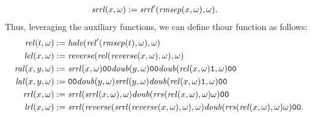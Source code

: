\begin{defn}
\begin{align*}
      \mathit{srrl}(x, \omega) &:= \mathit{srrl}'(\mathit{rmsep}(x, \omega), \omega).
    \end{align*}
    Thus, leveraging the auxiliary functions, we can define thour function as follows:
    \begin{align*}
      \rel(t,\omega) &:= \mathit{halv}(\rel'(\rmsep(t),\omega),\omega)\\
      \lel(x, \omega) &:= \reverse(\rel(\reverse(x, \omega), \omega), \omega)\\
      \ral(x, y, \omega) &:= \srrl(x, \omega)\zero \zero
                             \mathit{doub}(y, \omega)\zero \zero
                             \mathit{doub}(\rel(x,\omega)\one, \omega)\zero\zero
                              \\%
      \lal(x, y, \omega) &:= \zero \zero\mathit{doub}(y, \omega)
                              \srrl(y, \omega)
                              \mathit{doub}(\rel(x, \omega)\one, \omega)
                              \zero\zero\\%
      \rrl(x,\omega) &:=  \srrl(\srrl(x, \omega), \omega)
                          \mathit{doub}(\rrs(\rel(x, \omega),\omega) \omega)
                          \zero\zero \\
      \lrl(x,\omega) &:=  \srrl(\reverse(\srrl(\reverse(x, \omega), \omega),\omega)
                          \mathit{doub}(\rrs(\rel(x, \omega),\omega) \omega)
                          \zero\zero.
    \end{align*}
  \end{defn}

